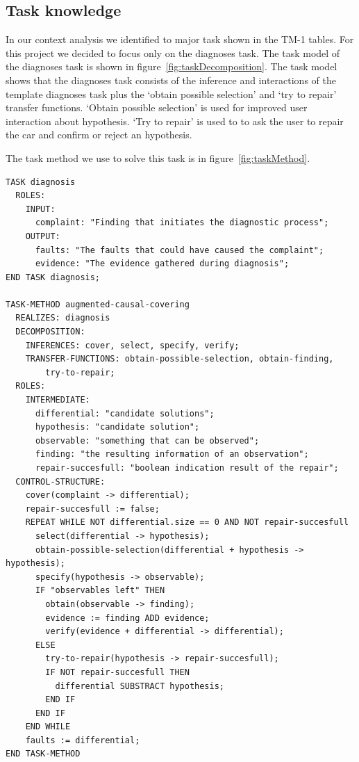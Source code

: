 \subsection{Task knowledge}
In our context analysis we identified to major task shown in the TM-1 tables.
For this project we decided to focus only on the diagnoses task. The task model
of the diagnoses task is shown in figure~\ref{fig:taskDecomposition}. The task
model shows that the diagnoses task consists of the inference and
interactions of the template diagnoses task plus the `obtain possible selection'
and `try to repair' transfer functions. `Obtain possible selection' is used for 
improved user interaction about hypothesis.
`Try to repair' is used to to ask the user to repair the car and confirm or
reject an hypothesis.

The task method we use to solve this task is in figure~\ref{fig:taskMethod}.
\begin{verbatim}
TASK diagnosis
  ROLES:
    INPUT:
      complaint: "Finding that initiates the diagnostic process";
    OUTPUT:
      faults: "The faults that could have caused the complaint";
      evidence: "The evidence gathered during diagnosis";
END TASK diagnosis;

TASK-METHOD augmented-causal-covering
  REALIZES: diagnosis
  DECOMPOSITION:
    INFERENCES: cover, select, specify, verify;
    TRANSFER-FUNCTIONS: obtain-possible-selection, obtain-finding,
        try-to-repair;
  ROLES:
    INTERMEDIATE:
      differential: "candidate solutions";
      hypothesis: "candidate solution";
      observable: "something that can be observed";
      finding: "the resulting information of an observation";
      repair-succesfull: "boolean indication result of the repair";
  CONTROL-STRUCTURE:
    cover(complaint -> differential);
    repair-succesfull := false;
    REPEAT WHILE NOT differential.size == 0 AND NOT repair-succesfull
      select(differential -> hypothesis);
      obtain-possible-selection(differential + hypothesis -> hypothesis);
      specify(hypothesis -> observable);
      IF "observables left" THEN
        obtain(observable -> finding);
        evidence := finding ADD evidence;
        verify(evidence + differential -> differential);
      ELSE
        try-to-repair(hypothesis -> repair-succesfull);
        IF NOT repair-succesfull THEN
          differential SUBSTRACT hypothesis;
        END IF
      END IF
    END WHILE
    faults := differential;
END TASK-METHOD

\end{verbatim}
